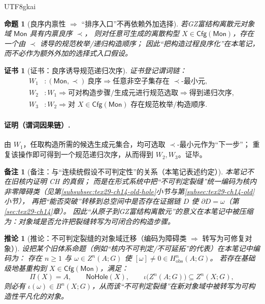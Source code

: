 \documentclass[12pt]{article}
\newtheorem{proposition}{命题}[section]
\newtheorem{corollary}{推论}[section]
\newtheorem{remark}{备注}[section]
\newtheorem{Certificate}{证书}[section]
\newcommand{\KouJing}{\texorpdfstring{表述约定}{表述约定}}
\newcommand{\GZMon}{\texorpdfstring{GZ富结构离散元}{GZ富结构离散元}}
\begin{document}
\begin{CJK*}{UTF8}{gkai}
\begin{proposition}[良序内禀性 $\Rightarrow$ “排序入口”不再依赖外加选择]
\label{prop:tex29-ch15-wellorder-intrinsic}
若\GZMon{}对象域 $\mathsf{Mon}$ 具有内禀良序 $\prec$，
则对任意可生成的离散构型 $X\in\mathsf{Cfg}(\mathsf{Mon})$，存在一个由 $\prec$ 诱导的规范枚举/递归构造顺序；
因此“把构造过程良序化”在本笔记，而不必作为额外外加的选择式入口假设。
\end{proposition}

\begin{Certificate}[证书：良序诱导规范递归次序]
\label{cert:tex29-ch15-wellorder-intrinsic}
证书登记谓词链：
\[
\begin{aligned}
  W_1 &: (\mathsf{Mon},\prec)\ \text{良序}\Rightarrow \text{任意非空子集存在 }\prec\text{-最小元},\\
  W_2 &: W_1\Rightarrow \text{可对构造步骤/生成元进行规范选取}\Rightarrow \text{得到递归次序},\\
  W_3 &: W_2\Rightarrow \text{对 }X\in\mathsf{Cfg}(\mathsf{Mon})\text{ 存在规范枚举/构造顺序}.
\end{aligned}
\]
\end{Certificate}

\paragraph{证明（谓词因果链）.}
由 $W_1$，任取构造所需的候选生成元集合，均可选取 $\prec$-最小元作为“下一步”；
重复该操作即可得到一个规范递归次序，从而得到 $W_2,W_3$。证毕。

\begin{remark}[备注：与“连续统假设不可判定性”的关系（本笔记\KouJing）]
本笔记不在旧核内证明 CH 的真假；
而是在形式系统中把“不可判定裂缝”统一编码为核内非零障碍类（见第\ref{subsubsec:tex29-ch14-old-hole}小节与第\ref{subsec:tex29-ch14-old}小节），
再把“能否突破”转移到总空间中是否存在证据链 $D$ 使 $\partial D=\omega$（第\ref{sec:tex29-ch14}章）。
因此“从原子到\GZMon{}”的意义在本笔记中被压缩为：对象域是否允许把裂缝转写为可闭合的构造步骤。
\end{remark}

\begin{corollary}[推论：不可判定裂缝的对象域迁移（编码为障碍类 $\Rightarrow$ 转写为可修复对象）]
\label{cor:tex29-ch15-undecidability-transport}
设把某个旧体系命题（例如“核内不可判定/不可延拓”的代表）在本笔记中编码为：
存在 $n\ge 1$ 与 $\omega\in Z^n(A;G)$ 使 $[\omega]\neq 0\in H^n_{\mathrm{obs}}(A;G)$。
若存在基础级地基重构到 $X\in\mathsf{Cfg}(\mathsf{Mon})$，满足：
\[
  \Pi(X)=A,\qquad \mathsf{NoHole}(X),\qquad \iota\bigl(Z^n(A;G)\bigr)\subseteq Z^n(X;G),
\]
则必有 $\iota(\omega)\in B^n(X;G)$，从而该“不可判定裂缝”在新对象域中被转写为可构造性平凡化的对象。
\end{corollary}


\end{CJK*}
\end{document}

